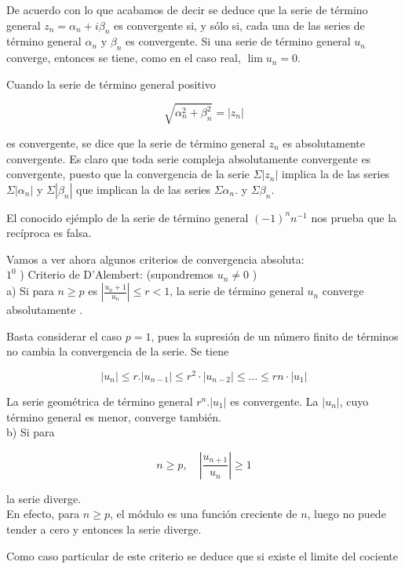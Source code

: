 \documentclass[10pt]{article}
\theoremstyle{plain}
\theoremstyle{definition}
\theoremstyle{remark}
\begin{document}
De acuerdo con lo que acabamos de decir se deduce que la serie de término general $z_{n}=\alpha_{n}+i \beta_{n}$ es convergente si, y sólo si, cada una de las series de término general $\alpha_{n}$ y $\beta_{n}$ es convergente. Si una serie de término general $u_{n}$ converge, entonces se tiene, como en el caso real, $\lim u_{n}=0$.

Cuando la serie de término general positivo

$$
\sqrt{\alpha_{n}^{2}+\beta_{n}^{2}}=\left|z_{n}\right|
$$

es convergente, se dice que la serie de término general $z_{n}$ es absolutamente convergente. Es claro que toda serie compleja absolutamente convergente es convergente, puesto que la convergencia de la serie $\Sigma\left|z_{n}\right|$ implica la de las series $\Sigma\left|\alpha_{n}\right|$ y $\Sigma\left|\beta_{n}\right|$ que implican la de las series $\Sigma \alpha_{n}$. y $\Sigma \beta_{n}$.

El conocido ejémplo de la serie de término general $(-1)^{n} n^{-1}$ nos prueba que la recíproca es falsa.

Vamos a ver ahora algunos criterios de convergencia absoluta:\\
$1^{0}$ ) Criterio de D'Alembert: (supondremos $u_{n} \neq 0$ )\\
a) Si para $n \geqslant p$ es $\left|\frac{u_{n}+1}{u_{n}}\right| \leqslant r<1$, la serie de término general $u_{n}$ converge absolutamente .

Basta considerar el caso $p=1$, pues la supresión de un número finito de términos no cambia la convergencia de la serie. Se tiene

$$
\left|u_{n}\right| \leqslant r .\left|u_{n-1}\right| \leqslant r^{2} \cdot\left|u_{n-2}\right| \leqslant \ldots \leqslant r n \cdot\left|u_{1}\right|
$$

La serie geométrica de término general $r^{n} .\left|u_{1}\right|$ es convergente. La $\left|u_{n}\right|$, cuyo término general es menor, converge también.\\
b) Si para

$$
n \geqslant p, \quad\left|\frac{u_{n+1}}{u_{n}}\right| \geqslant 1
$$

la serie diverge.\\
En efecto, para $n \geqslant p$, el módulo es una función creciente de $n$, luego no puede tender a cero y entonces la serie diverge.

Como caso particular de este criterio se deduce que si existe el limite del cociente
\end{document}
